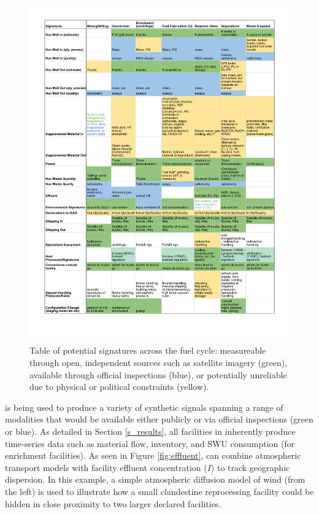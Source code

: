 \begin{figure}%
\begin{center}
\includegraphics[scale=0.8]{./figs/signatures_table.pdf}
\end{center}
\caption{Table of potential signatures across the fuel cycle: measureable through open, independent sources such as satellite imagery (green), available through official inspections (blue), or potentially unreliable due to physical or political constraints (yellow).\cite{kemp_environmental_2016,_plutonium_????,ferreira_radiometric_2012,stork_systematic_2006}}
\label{fig:signatures}
\end{figure}

\Cyclus is being used to produce a variety of synthetic signals spanning a range of modalities that would be available either publicly or via official inspections (green or blue).  As detailed in Section \ref{s_results}, all facilities in \Cyclus inherently produce time-series data such as material flow, inventory, and \gls{SWU} consumption (for enrichment facilities). As seen in Figure \ref{fig:effluent}, \Cyclus can combine atmospheric transport models with facility effluent concentration ($I$) to track geographic dispersion. In this example, a simple atmospheric diffusion model of wind (from the left) is used to illustrate how a small clandestine reprocessing facility could be hidden in close proximity to two larger declared facilities\cite{hanna_handbook_1982}. 

